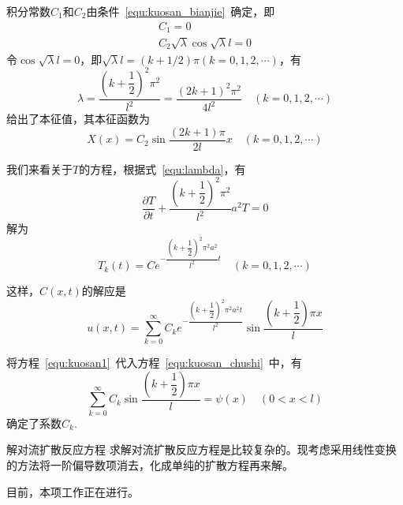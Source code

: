\documentclass[xcolor=dvipsnames]{beamer}
\begin{document}
\begin{frame}
积分常数$C_1$和$C_2$由条件~\ref{equ:kuosan_bianjie}~确定，即
\begin{equation}
\begin{gathered}
	C_1 = 0 \\
	C_2\sqrt{\lambda}\cos\sqrt{\lambda}l=0
\end{gathered}
\end{equation}
令$\cos\sqrt{\lambda}l=0$，即$\sqrt{\lambda}l=(k+1/2)\pi(k=0,1,2,\cdots)$，有
\begin{equation}\label{equ:lambda}
\lambda = \dfrac{{\left(k+\dfrac{1}{2}\right)}^2\pi^2}{l^2}=\dfrac{{(2k+1)}^2\pi^2}{4l^2}\quad(k=0,1,2,\cdots)
\end{equation}
给出了本征值，其本征函数为
\begin{equation}
X(x)=C_2\sin\dfrac{(2k+1)\pi}{2l}x\quad(k=0,1,2,\cdots)
\end{equation}\par
\end{frame}
\begin{frame}
我们来看关于$T$的方程，根据式~\ref{equ:lambda}，有
\begin{equation}
\dfrac{\partial T}{\partial t} + \dfrac{{\left(k+\dfrac{1}{2}\right)}^2\pi^2}{l^2}a^2T=0
\end{equation}
解为
\begin{equation}
T_k(t)=Ce^{-\dfrac{{\left(k+\dfrac{1}{2}\right)}^2\pi^2 a^2}{l^2}t}\quad(k=0,1,2,\cdots)
\end{equation}\par
这样，$C(x,t)$的解应是
\begin{equation}\label{equ:kuosan_jie1}
	u(x,t)= \sum_{k=0}^{\infty}C_ke^{-\dfrac{{\left(k+\dfrac{1}{2}\right)}^2\pi^2 a^2t}{l^2}}
		    \sin\dfrac{\left(k+\dfrac{1}{2}\right)\pi x}{l}
\end{equation}
\end{frame}
\begin{frame}
将方程~\ref{equ:kuosan1}~代入方程~\ref{equ:kuosan_chushi}~中，有
\begin{equation}
\sum_{k=0}^{\infty} C_k\sin\dfrac{\left(k+\dfrac{1}{2}\right)\pi x}{l} = \psi(x)\quad(0<x<l)
\end{equation}
确定了系数$C_k$.
\end{frame}
\begin{frame}{解对流扩散反应方程}
求解对流扩散反应方程是比较复杂的。现考虑采用线性变换的方法将一阶偏导数项消去，化成单纯的扩散方程再来解。\par
目前，本项工作正在进行。
\end{frame}
\end{document}
